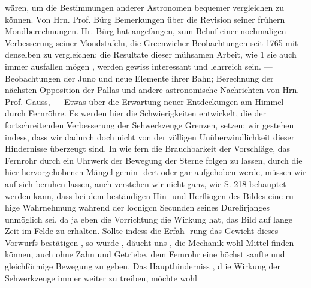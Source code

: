 \documentclass[12pt,a4paper]{article}
\begin{document}
wären, um die Bestimmungen anderer Astronomen bequemer vergleichen zu können. Von Hrn. Prof.\newline
Bürg Bemerkungen über die Revision seiner frühern Mondberechnungen. Hr. Bürg hat angefangen, zum\newline
Behuf einer nochmaligen Verbesserung seiner Mondstafeln, die Greenwicher Beobachtungen seit 1765\newline
mit denselben zu vergleichen: die Resultate dieser mühsamen Arbeit, wie 1 sie auch immer ausfallen\newline
mögen , werden gewiss interessant und lehrreich sein. --- Beobachtungen der Juno und neue Elemente\newline
ihrer Bahn; Berechnung der nächsten Opposition der Pallas und andere astronomische Nachrichten von\newline
Hrn. Prof. Gauss, --- Etwas über die Erwartung neuer Entdeckungen am Himmel durch Fernröhre. Es\newline
werden hier die Schwierigkeiten entwickelt, die der fortschreitenden Verbesserung der Sehwerkzeuge\newline
Grenzen, setzen: wir gestehen indess, dass wir dadurch doch nicht von der völligen Unüberwindlichkeit\newline
dieser Hindernisse überzeugt sind. In wie fern die Brauchbarkeit der Vorschläge, das Fernrohr durch\newline
ein Uhrwerk der Bewegung der Sterne folgen zu lassen, durch die hier hervorgehobenen Mängel gemin-\newline
dert oder gar aufgehoben werde, müssen wir auf sich beruhen lassen, auch verstehen wir nicht ganz,\newline
wie S. 218 behauptet werden kann, dass bei dem beständigen Hin- und Herfliogen des Bildes eine ru-\newline
hige Wahrnehmung wahrend der locnigcn Secunden seines Durelirjanges unmöglich sei, da ja eben die\newline
Vorrichtung die Wirkung hat, das Bild auf lange Zeit im Felde zu erhalten. Sollte indess die Erfah-\newline
rung das Gewicht dieses Vorwurfs bestätigen , so würde , däucht uns , die Mechanik wohl Mittel finden\newline
können, auch ohne Zahn und Getriebe, dem Femrohr eine höchst sanfte und gleichförmige Bewegung\newline
zu geben. Das Haupthinderniss , d ie Wirkung der Sehwerkzeuge immer weiter zu treiben, möchte wohl\newline
\end{document}
